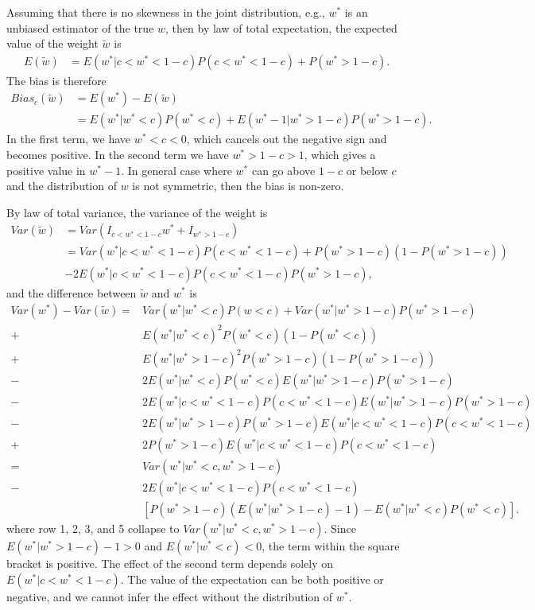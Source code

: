 \documentclass[11pt]{article}
\begin{document}
Assuming that there is no skewness in the joint distribution, e.g.,
\(w^*\) is an unbiased estimator of the true \(w\), then by law of total expectation, the expected value of
the weight \(\tilde{w}\) is
\begin{equation}
\label{eqn: E w trunc}
\begin{aligned}
E(\tilde{w}) &= E(w^*|c<w^*<1-c)P(c<w^*<1-c) + P(w^*>1-c).
\end{aligned}
\end{equation}
The bias is therefore
\begin{equation}
\label{eqn: bias w trunc}
\begin{aligned}
Bias_c(\tilde{w}) &= E(w^*) - E(\tilde{w}) \\
&= E(w^*|w^*<c)P(w^*<c) + E(w^*-1|w^*>1-c)P(w^*>1-c).
\end{aligned}
\end{equation}
In the first term, we have \(w^*<c<0\), which cancels out the negative
sign and becomes positive. In the second term we have \(w^*>1-c>1\), which
gives a positive value in \(w^*-1\). In general case where \(w^*\) can go
above \(1-c\) or below \(c\) and the distribution of \(w\) is not symmetric, then the
bias is non-zero.

By law of total variance, the variance of the weight is
\begin{equation}
\label{eqn: var w trunc}
\begin{aligned}
Var(\tilde{w}) &= Var(I_{c<w^*<1-c}w^*+I_{w^*>1-c})\\
&=Var(w^*|c<w^*<1-c)P(c<w^*<1-c) + P(w^*>1-c)(1-P(w^*>1-c)) \\&- 2E(w^*|c<w^*<1-c)P(c<w^*<1-c)P(w^*>1-c),
\end{aligned}
\end{equation}
and the difference between $\tilde{w}$ and $w^*$ is
\begin{equation}
\label{eqn: delta var w trunc}
\begin{aligned}
Var(w^*) - Var(\tilde{w})=& Var(w^* | w^*<c)P(w<c)+Var(w^*|w^*>1-c)P(w^*>1-c)\\
+&E(w^*|w^*<c)^2P(w^*<c)(1-P(w^*<c))\\
+&E(w^*|w^*>1-c)^2P(w^*>1-c)(1-P(w^*>1-c))\\
-&2E(w^*|w^*<c)P(w^*<c)E(w^*|w^*>1-c)P(w^*>1-c)\\
-&2E(w^*|c<w^*<1-c)P(c<w^*<1-c)E(w^*|w^*>1-c)P(w^*>1-c)\\
-&2E(w^*|w^*>1-c)P(w^*>1-c)E(w^*|c<w^*<1-c)P(c<w^*<1-c)\\
+&2P(w^*>1-c)E(w^*|c<w^*<1-c)P(c<w^*<1-c)\\
=& Var(w^*|w^*<c, w^*>1-c)\\
-&2E(w^*|c<w^*<1-c)P(c<w^*<1-c)\\&[P(w^*>1-c)(E(w^*|w^*>1-c)-1)-E(w^*|w^*<c)P(w^*<c)].
\end{aligned}
\end{equation}
where row 1, 2, 3, and 5 collapse to $Var(w^*|w^*<c, w^*>1-c)$. Since $E(w^*|w^*>1-c)-1 >0$ and $E(w^*|w^*<c)<0$, the term within the square bracket is positive. The effect of the second term depends solely on $E(w^*|c<w^*<1-c)$. The value of the expectation can be both positive or negative, and we cannot infer the effect without the distribution of $w^*$. 
\end{document}
